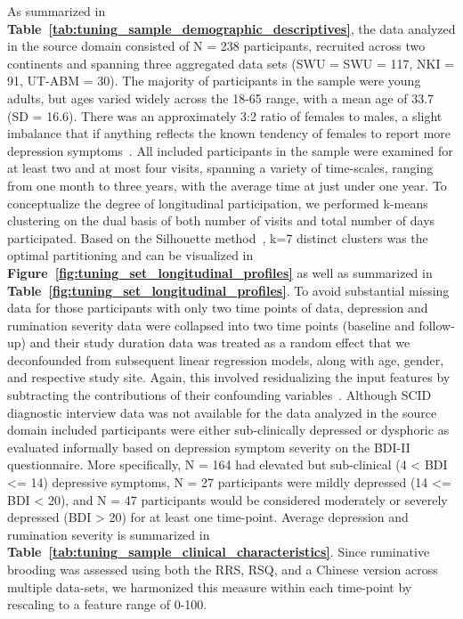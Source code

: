 \documentclass[
  notitlepage]{article}
\begin{document}
As summarized in \textbf{Table~\ref{tab:tuning_sample_demographic_descriptives}},
the data analyzed in the source domain consisted of N = 238
participants, recruited across two continents and spanning three
aggregated data sets (SWU = SWU = 117, NKI = 91, UT-ABM = 30). The
majority of participants in the sample were young adults, but ages
varied widely across the 18-65 range, with a mean age of 33.7 (SD =
16.6). There was an approximately 3:2 ratio of females to males, a
slight imbalance that if anything reflects the known tendency of females
to report more depression symptoms~\cite{Butler1994}.
All included participants in the sample were examined for at least two
and at most four visits, spanning a variety of time-scales, ranging from
one month to three years, with the average time at just under one year.
To conceptualize the degree of longitudinal participation, we performed
k-means clustering on the dual basis of both number of visits and total
number of days participated. Based on the Silhouette
method~\cite{Rousseeuw1987}, k=7 distinct clusters was
the optimal partitioning and can be visualized in \textbf{Figure~\ref{fig:tuning_set_longitudinal_profiles}} as well as summarized in
\textbf{Table~\ref{fig:tuning_set_longitudinal_profiles}}. To avoid substantial
missing data for those participants with only two time points of data,
depression and rumination severity data were collapsed into two time
points (baseline and follow-up) and their study duration data was
treated as a random effect that we deconfounded from subsequent linear
regression models, along with age, gender, and respective study site.
Again, this involved residualizing the input features by subtracting the
contributions of their confounding
variables~\cite{Chyzhyk2018,Rao2017}. Although SCID
diagnostic interview data was not available for the data analyzed in the
source domain included participants were either sub-clinically depressed
or dysphoric as evaluated informally based on depression symptom
severity on the BDI-II questionnaire. More specifically, N = 164 had
elevated but sub-clinical (4 \textless{} BDI \textless= 14) depressive
symptoms, N = 27 participants were mildly depressed (14 \textless= BDI
\textless{} 20), and N = 47 participants would be considered moderately
or severely depressed (BDI \textgreater{} 20) for at least one
time-point. Average depression and rumination severity is summarized in
\textbf{Table~\ref{tab:tuning_sample_clinical_characteristics}}. Since ruminative
brooding was assessed using both the RRS, RSQ, and a Chinese version
across multiple data-sets, we harmonized this measure within each
time-point by rescaling to a feature range of 0-100.
\end{document}
